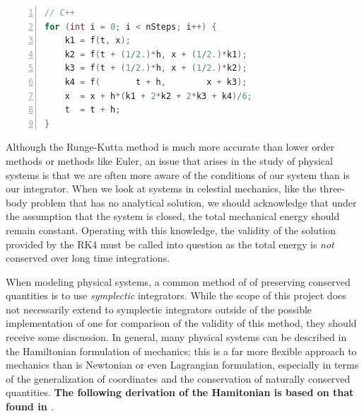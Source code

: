 \documentclass[onecolumn,titlepage,letterpaper,10pt]{article}
\begin{document}
\begin{lstlisting}[language=c++, numbers=left, caption=Fourth-order Runge-Kutta (RK4),
label=listing_RK4, float=h!]
// C++
for (int i = 0; i < nSteps; i++) {
    k1 = f(t, x);
    k2 = f(t + (1/2.)*h, x + (1/2.)*k1);
    k3 = f(t + (1/2.)*h, x + (1/2.)*k2);
    k4 = f(       t + h,        x + k3);
    x  = x + h*(k1 + 2*k2 + 2*k3 + k4)/6;
    t  = t + h;
}
\end{lstlisting}

Although the Runge-Kutta method is much more accurate than lower order methods
or methods like Euler, an issue that arises in the study of physical
systems is that we are often more aware of the conditions of our system than is
our integrator. When we look at systems in celestial mechanics, like the
three-body problem that has no analytical solution, we should
acknowledge that under the assumption that the system is closed, the total
mechanical energy should remain constant. Operating with this
knowledge, the validity of the solution provided by the RK4 must be called into
question as the total energy is \textit{not} conserved over long time
integrations. \cite{holmes_2018}

When modeling physical systems, a common method of of preserving conserved
quantities is to use \textit{symplectic} integrators.
While the scope of this project does not necessarily extend
to symplectic integrators outside of the possible implementation of one for
comparison of the validity of this method, they should receive some discussion.
In general, many physical systems can be described in the Hamiltonian
formulation of mechanics; this is a far more flexible approach to mechanics than
is Newtonian or even Lagrangian formulation, especially in terms of the
generalization of coordinates and the conservation of naturally conserved
quantities. \textbf{The following derivation of the Hamitonian is based on that found in
    \citet{taylor_2005}}.
\end{document}
